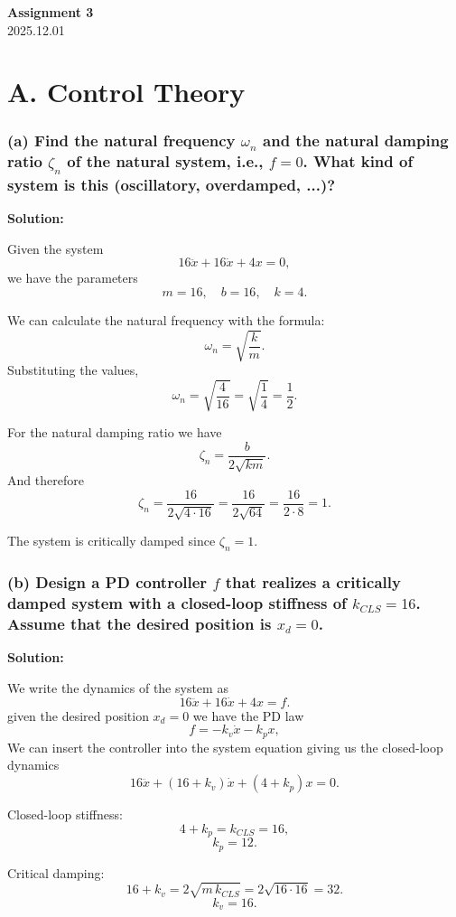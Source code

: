 \documentclass[a4paper,12pt]{article}
\begin{document}
\begin{center}
    \Large \textbf{Assignment 3} \\[6pt]
    2025.12.01
\end{center}

\section*{A. Control Theory}
\subsubsection*{(a) Find the natural frequency $\omega_n$ and the natural damping ratio $\zeta_n$ of the natural system, i.e., $f = 0$.  What kind of system is this (oscillatory, overdamped, ...)?} 
\textbf{Solution:}

Given the system
\[
16\ddot{x} + 16\dot{x} + 4x = 0,
\]
we have the parameters
\[
m = 16,\quad b = 16,\quad k = 4.
\]


We can calculate the natural frequency with the formula:
\[
\omega_n = \sqrt{\frac{k}{m}}.
\]
Substituting the values,
\[
\omega_n = \sqrt{\frac{4}{16}}
         = \sqrt{\frac{1}{4}}
         = \frac{1}{2}.
\]

For the natural damping ratio we have
\[
\zeta_n = \frac{b}{2\sqrt{km}}.
\]
And therefore
\[
\zeta_n = \frac{16}{2\sqrt{4\cdot 16}}
        = \frac{16}{2\sqrt{64}}
        = \frac{16}{2\cdot 8}
        = 1.
\]

The system is critically damped since $\zeta_n = 1$.

\subsubsection*{(b) Design a PD controller $f$ that realizes a critically damped system with a closed-loop stiffness of $k_{CLS} = 16$. Assume that the desired position is $x_d = 0$.}   
\textbf{Solution:}

We write the dynamics of the system as
\[
16\ddot{x} + 16\dot{x} + 4x = f.
\]
given the desired position \(x_d = 0\) we have the PD law
\[
f = -k_v \dot{x} - k_p x,
\]
We can insert the controller into the system equation giving us the closed-loop dynamics
\[
16\ddot{x} + (16 + k_v)\dot{x} + (4 + k_p)x = 0.
\]

Closed-loop stiffness:
\[
4 + k_p = k_{CLS} = 16,
\]
\[
k_p = 12.
\]

Critical damping:
\[
16 + k_v = 2\sqrt{m\,k_{CLS}}
           = 2\sqrt{16 \cdot 16}
           = 32.
\]
\[
k_v = 16.
\]
\end{document}
